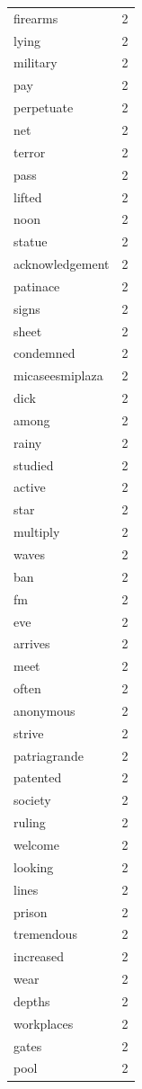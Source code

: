 \begin{tabular}{lr}
firearms & 2 \\
lying & 2 \\
military & 2 \\
pay & 2 \\
perpetuate & 2 \\
net & 2 \\
terror & 2 \\
pass & 2 \\
lifted & 2 \\
noon & 2 \\
statue & 2 \\
acknowledgement & 2 \\
patinace & 2 \\
signs & 2 \\
sheet & 2 \\
condemned & 2 \\
micaseesmiplaza & 2 \\
dick & 2 \\
among & 2 \\
rainy & 2 \\
studied & 2 \\
active & 2 \\
star & 2 \\
multiply & 2 \\
waves & 2 \\
ban & 2 \\
fm & 2 \\
eve & 2 \\
arrives & 2 \\
meet & 2 \\
often & 2 \\
anonymous & 2 \\
strive & 2 \\
patriagrande & 2 \\
patented & 2 \\
society & 2 \\
ruling & 2 \\
welcome & 2 \\
looking & 2 \\
lines & 2 \\
prison & 2 \\
tremendous & 2 \\
increased & 2 \\
wear & 2 \\
depths & 2 \\
workplaces & 2 \\
gates & 2 \\
pool & 2 \\

\end{tabular}
